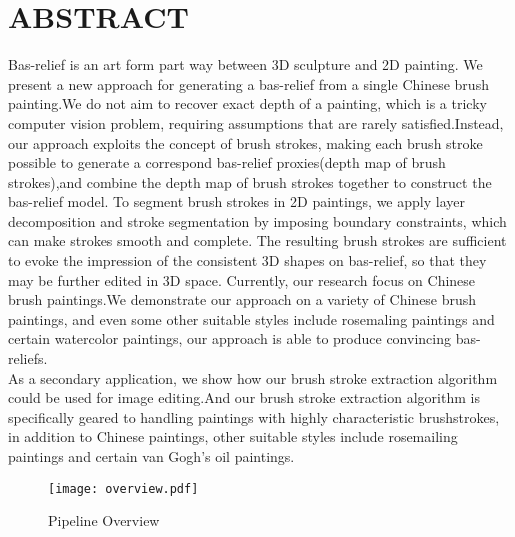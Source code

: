 \section*{\centering ABSTRACT}
Bas-relief is an art form part way between 3D sculpture and 2D painting. We present a new approach for generating a bas-relief from a single Chinese brush painting.We do not aim to recover exact depth of a painting, which is a tricky computer vision problem, requiring assumptions that are rarely satisfied.Instead, our approach exploits the concept of brush strokes, making each brush stroke possible to generate a correspond bas-relief proxies(depth map of brush strokes),and combine the depth map of brush strokes together to construct the bas-relief model. To segment brush strokes in 2D paintings, we apply layer decomposition and stroke segmentation by imposing boundary constraints, which can make strokes smooth and complete. The resulting brush strokes are sufficient to evoke the impression of the consistent 3D shapes on bas-relief, so that they may be further edited in 3D space. Currently, our research focus on Chinese brush paintings.We demonstrate our approach on a variety of Chinese brush paintings, and even some other suitable styles include rosemaling paintings and certain watercolor paintings, our approach is able to produce convincing bas-reliefs.\\
As a secondary application, we show how our brush stroke extraction algorithm could be used for image editing.And our brush stroke extraction algorithm is specifically geared to handling paintings with highly characteristic brushstrokes, in addition to Chinese paintings, other suitable styles include rosemailing paintings and certain van Gogh's oil paintings.

\begin{figure}[H]
\centering
\texttt{[image: overview.pdf]}
\caption{Pipeline Overview}
\label{pip}
\end{figure} 
 
\newpage


 

